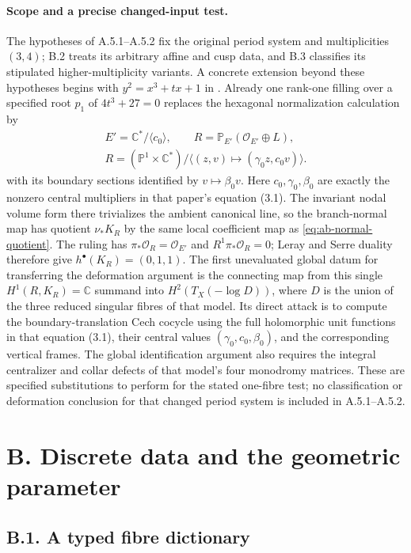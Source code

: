 \paragraph{Scope and a precise changed-input test.}
The hypotheses of A.5.1--A.5.2 fix the original period system and
multiplicities $(3,4)$; B.2 treats its arbitrary affine and cusp data,
and B.3 classifies its stipulated higher-multiplicity variants.
A concrete extension beyond these hypotheses begins with
$y^2=x^3+tx+1$ in \cite[Sections 2--3 and Proposition 6.1]{VTwo26}.
Already one rank-one filling over a specified root $p_1$ of
$4t^3+27=0$ replaces the hexagonal normalization calculation by
\[
 \begin{gathered}
 E'=\mathbb C^*/\langle c_0\rangle,\qquad
 R=\mathbb P_{E'}(\mathcal O_{E'}\oplus L),\\
 R=(\mathbb P^1\times\mathbb C^*)/
       \langle(z,v)\mapsto(\gamma_0z,c_0v)\rangle.
 \end{gathered}
\]
with its boundary sections identified by $v\mapsto\beta_0v$.
Here $c_0,\gamma_0,\beta_0$ are exactly the nonzero central multipliers
in that paper's equation (3.1). The invariant nodal volume form there
trivializes the ambient canonical line, so the branch-normal map has
quotient $\nu_*K_R$ by the same local coefficient map as
\eqref{eq:ab-normal-quotient}. The ruling has
$\pi_*\mathcal O_R=\mathcal O_{E'}$ and $R^1\pi_*\mathcal O_R=0$;
Leray and Serre duality therefore give $h^\bullet(K_R)=(0,1,1)$.
The first unevaluated global datum for transferring the deformation
argument is the connecting map from this single
$H^1(R,K_R)=\mathbb C$ summand into $H^2(T_X(-\log D))$, where
$D$ is the union of the three reduced singular fibres of that model.
Its direct attack is to compute the boundary-translation Cech cocycle
using the full holomorphic unit functions in that equation (3.1),
their central values $(\gamma_0,c_0,\beta_0)$, and the corresponding
vertical frames.
The global identification argument also requires the integral
centralizer and collar defects of that model's four monodromy matrices.
These are specified substitutions to perform for the stated one-fibre
test; no classification or deformation conclusion for that changed
period system is included in A.5.1--A.5.2.

\section{B. Discrete data and the geometric parameter}
\subsection{B.1. A typed fibre dictionary}

